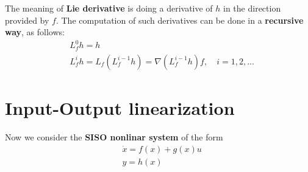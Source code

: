 \vspace{0.5cm}
\hspace*{-5mm}
%

\noindent
The meaning of \textbf{Lie derivative} is doing a derivative of $h$ in the direction provided by $f$. The computation of such derivatives can be done in a \textbf{recursive way}, as follows: 
\begin{align*}
    &L_f^0h=h\\
    &L_f^ih=L_f(L_f^{i-1}h)=\nabla(L_f^{i-1}h)f, \quad i=1, 2, ...
\end{align*}

\section{Input-Output linearization}
Now we consider the \textbf{SISO nonlinar system} of the form 
\begin{equation} \label{eq: system_affine}
    \begin{aligned}
        &\dot{x} = f(x)+g(x)u\\
        &y=h(x)
\end{aligned}
\end{equation}

